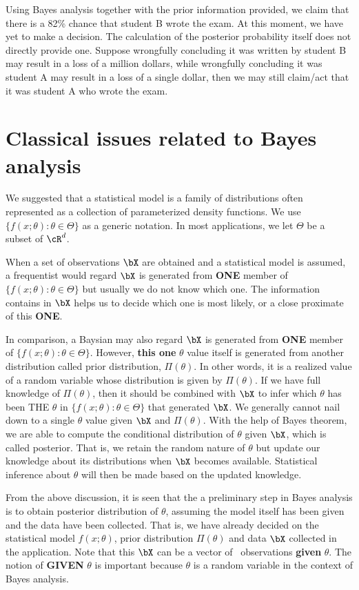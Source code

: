 Using Bayes analysis together with the prior information provided,
we claim that there is a 82\% chance that student B wrote the exam.
At this moment, we have yet to make a decision. The calculation
of the posterior probability itself does not directly provide one. 
Suppose wrongfully concluding it was written by student B may
result in a loss of a million dollars, while wrongfully concluding
it was student A may result in a loss of a single dollar, then we may still
claim/act that it was student A who wrote the exam.

\section{Classical issues related to Bayes analysis}

We suggested that a statistical model is a family of distributions
often represented as a collection of parameterized density functions.
We use $\{f(x; \theta): \theta \in \Theta\}$ as a generic notation.
In most applications, we let $\Theta$ be a subset of $\cR^d$.

When a set of observations $\bX$ are obtained and a statistical model is
assumed, a frequentist would regard $\bX$ is generated from {\bf ONE}
member of $\{f(x; \theta): \theta \in \Theta\}$ but usually we do not know
which one. The information contains in $\bX$ helps us to decide which
one is most likely, or a close proximate of this {\bf ONE}.

In comparison, a Baysian may also regard $\bX$ is generated from {\bf ONE}
member of $\{f(x; \theta): \theta \in \Theta\}$. However, {\bf this one} $\theta$ 
value itself is generated from another distribution called prior distribution, 
$\Pi(\theta)$. 
In other words, it is
a realized value of a random variable whose distribution is given by
$\Pi(\theta)$. If we have full knowledge of $\Pi(\theta)$, then it should
be combined with $\bX$ to infer which $\theta$ has been THE $\theta$
in $\{f(x; \theta): \theta \in \Theta\}$ that generated $\bX$.
We generally cannot nail down to a single $\theta$ value given $\bX$
and $\Pi(\theta)$. 
With the help of Bayes theorem, we are able to compute the conditional
distribution of $\theta$ given $\bX$, which is called posterior. That is,
we retain the random nature of $\theta$ but update our knowledge
about its distributions when $\bX$ becomes available.
Statistical inference about $\theta$ will then be made based on the 
updated knowledge.

From the above discussion, it is seen that the a preliminary step in
Bayes analysis is to obtain posterior distribution of $\theta$,
assuming the model itself has been given and the data have been
collected. That is, we have already decided on the statistical model
$f(x; \theta)$, prior distribution $\Pi(\theta)$ and data $\bX$ collected
in the application.
Note that this $\bX$ can be a vector of \iid\ observations 
{\bf given} $\theta$. The notion of {\bf GIVEN} $\theta$ is important
because $\theta$ is a random variable in the context of Bayes analysis.

